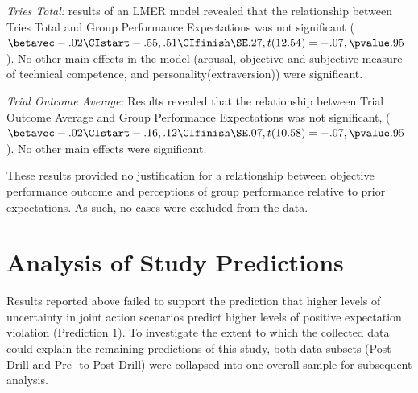 \textit{Tries Total:} results of an LMER model revealed that the relationship between Tries Total and Group Performance Expectations was not significant ($\betavec -.02 \CIstart -.55, .51 \CIfinish \SE .27, t(12.54)= -.07, \pvalue .95$).  No other main effects in the model (arousal, objective and subjective measure of technical competence, and personality(extraversion)) were significant.

\textit{Trial Outcome Average:} Results revealed that the relationship between Trial Outcome Average and Group Performance Expectations was not significant, ($\betavec -.02 \CIstart -.16, .12 \CIfinish \SE .07, t(10.58)= -.07, \pvalue .95$). No other main effects were significant.

These results provided no justification for a relationship between objective performance outcome and perceptions of group performance relative to prior expectations.  As such, no cases were excluded from the data.


























\section{Analysis of Study Predictions\label{sect:resultsStudyPredictions}}




Results reported above failed to support the prediction that higher levels of uncertainty in joint action scenarios predict higher levels of positive expectation violation (Prediction 1).  To investigate the extent to which the collected data could explain the remaining predictions of this study, both data subsets (Post-Drill and Pre- to Post-Drill) were collapsed into one overall sample for subsequent analysis.



